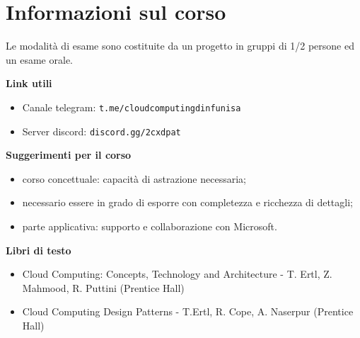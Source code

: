 \chapter{Informazioni sul corso}
Le modalità di esame sono costituite da un progetto in gruppi di 1/2 persone ed un esame orale.

\vspace{5mm}

\textbf{Link utili}
\begin{itemize}
    \item Canale telegram: \texttt{t.me/cloudcomputingdinfunisa}
    \item Server discord: \texttt{discord.gg/2cxdpat}
\end{itemize}

\textbf{Suggerimenti per il corso}
\begin{itemize}
    \item corso concettuale: capacità di astrazione necessaria;
    \item necessario essere in grado di esporre con completezza e ricchezza di dettagli;
    \item parte applicativa: supporto e collaborazione con Microsoft.
\end{itemize}

\textbf{Libri di testo}
\begin{itemize}
    \item Cloud Computing: Concepts, Technology and Architecture - T. Ertl, Z. Mahmood, R. Puttini (Prentice Hall)
\item Cloud Computing Design Patterns - T.Ertl, R. Cope, A. Naserpur (Prentice Hall)
\end{itemize}